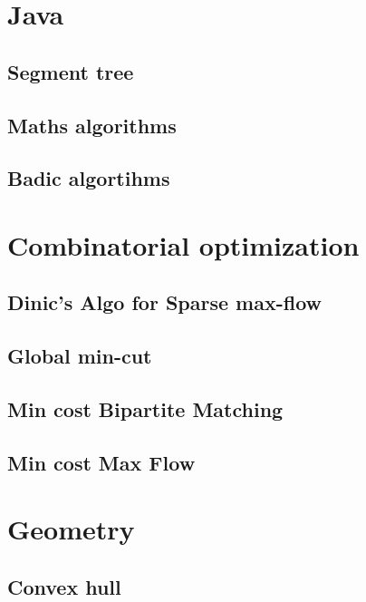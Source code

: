 \section{Java}
\subsection{Segment tree}
\raggedbottom
\hrulefill
\subsection{ Maths algorithms}
\raggedbottom
\hrulefill
\subsection{ Badic algortihms}
\raggedbottom
\hrulefill

\section{Combinatorial optimization}
\subsection{Dinic's Algo for Sparse max-flow}
\raggedbottom
\hrulefill
\subsection{Global min-cut}
\raggedbottom
\hrulefill
\subsection{Min cost Bipartite Matching}
\raggedbottom
\hrulefill
\subsection{Min cost Max Flow}
\raggedbottom
\hrulefill

\section{Geometry}
\subsection{Convex hull}
\raggedbottom
\hrulefill
